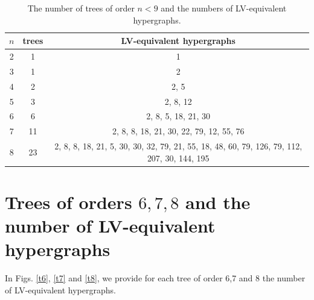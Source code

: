 \documentclass{article}
\begin{document}
\begin{table}[H]
\begin{center}
\begin{tabular}{c|c|c}
$n$ & trees & LV-equivalent hypergraphs \\
\hline
2 & 1 & 1 \\
3 & 1 & 2 \\
4 & 2 & 2, 5 \\
5 & 3 & 2, 8, 12 \\
6 & 6 & 2, 8, 5, 18, 21, 30 \\
7 & 11 & 2, 8, 8, 18, 21, 30, 22, 79, 12, 55, 76 \\
8 & 23 & 2, 8, 8, 18, 21, 5, 30, 30, 32, 79, 21, 55, 18, 48, 60, 79, 126, 79, 112, 207, 30, 144, 195 
\end{tabular}
\vspace{2mm}

\parbox{12.5cm}{\caption{\label{seh} The number of trees of order $n<9$ and the numbers of LV-equivalent hypergraphs.}}
\end{center}
\end{table}

\appendix

\section{Trees of orders $6,7,8$ and the number of LV-equivalent hypergraphs}
In Figs. \ref{t6}, \ref{t7} and \ref{t8}, we provide for each tree of order 6,7 and 8 the number of LV-equivalent hypergraphs.
\end{document}
